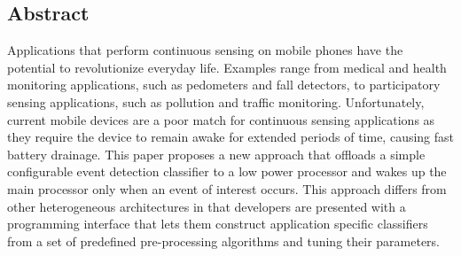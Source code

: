 \subsection*{Abstract}
 
Applications that perform continuous sensing on mobile pho\-nes have the
potential to revolutionize everyday life.  Examples range from medical
and health monitoring applications, such as pedometers and fall
detectors, to participatory sensing applications, such as pollution
and traffic monitoring.  Unfortunately, current mobile devices are a
poor match for continuous sensing applications as they require the
device to remain awake for extended periods of time, causing fast
battery drainage.  This paper proposes a new approach that offloads a
simple configurable event detection classifier to a low power
processor and wakes up the main processor only when an event of
interest occurs.  This approach differs from other heterogeneous
architectures in that developers are presented with a programming
interface that lets them construct application specific classifiers
from a set of predefined pre-processing algorithms and tuning their
parameters.
 

